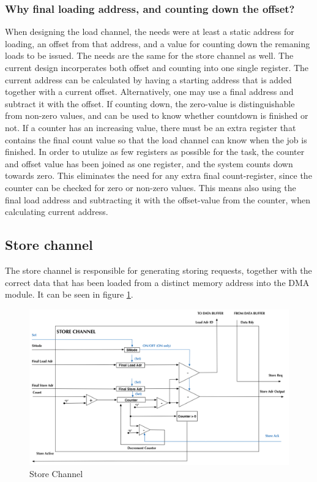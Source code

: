\begin{appendix}
\subsubsection{Why final loading address, and counting down the offset?}
When designing the load channel, the needs were at least a static address for loading, an offset from that address, and a value for counting down the remaning loads to be issued.
The needs are the same for the store channel as well.
The current design incorperates both offset and counting into one single register.
The current address can be calculated by having a starting address that is added together with a current offset.
Alternatively, one may use a final address and subtract it with the offset.
If counting down, the zero-value is distinguishable from non-zero values, and can be used to know whether countdown is finished or not.
If a counter has an increasing value, there must be an extra register that contains the final count value so that the load channel can know when the job is finished.
In order to utulize as few registers as possible for the task, the counter and offset value has been joined as one register, and the system counts down towards zero.
This eliminates the need for any extra final count-register, since the counter can be checked for zero or non-zero values.
This means also using the final load address and subtracting it with the offset-value from the counter, when calculating current address.

\subsection{Store channel}
The store channel is responsible for generating storing requests, together with the correct data that has been loaded from a distinct memory address into the DMA module.
It can be seen in figure \ref{fig:storeChannel}.


\begin{figure}[h!]
    \centering
    \includegraphics[width=1.0\textwidth]{Figures/DMA/StoreChannel}
    \caption{Store Channel}
    \label{fig:storeChannel}
\end{figure}


\end{appendix}
